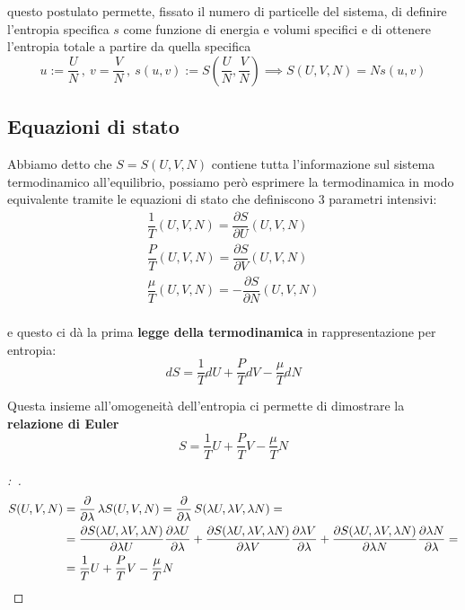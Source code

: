 \documentclass[11pt,a4paper,twoside]{book}
\newenvironment{dimo}[1][\proofname]{
	\begin{tcolorbox}[
	breakable, 
	enhanced, 
	interior hidden, 
	frame hidden, 
	borderline west = {1pt}{0pt}{gray}, 
	top=0pt, bottom=0pt, left=0pt]
\begin{proof}[#1:~]
}
{
\end{proof}
\end{tcolorbox}
}
\numberwithin{equation}{section} %
\begin{document}
questo postulato permette, fissato il numero di particelle del sistema, di definire l'entropia specifica $s$ come funzione di energia e volumi specifici e di ottenere l'entropia totale a partire da quella specifica
\[
u:=\dfrac{U}{N} \,,\>  v=\dfrac{V}{N} \,,\> s(u,v):=S\left(\dfrac{U}{N},\dfrac{V}{N}\right)  \implies S(U,V,N)=N s(u,v)
\]

\subsection{Equazioni di stato}

Abbiamo detto che $S=S(U,V,N)$ contiene tutta l'informazione sul sistema termodinamico all'equilibrio, possiamo però esprimere la termodinamica in modo equivalente tramite le equazioni di stato che definiscono $3$ parametri intensivi:
\begin{align}
\dfrac{1}{T}(U,V,N)=\dfrac{\partial S}{\partial U} (U,V,N) \\
\dfrac{P}{T}(U,V,N)=\dfrac{\partial S}{\partial V} (U,V,N) \\
\dfrac{\mu}{T}(U,V,N)=-\dfrac{\partial S}{\partial N} (U,V,N) \\
\end{align}

e questo ci dà la prima \textbf{legge della termodinamica} in rappresentazione per entropia:
\begin{equation}
dS=\dfrac{1}{T}dU+\dfrac{P}{T}dV-\dfrac{\mu}{T}dN
\end{equation}

Questa insieme all'omogeneità dell'entropia ci permette di dimostrare la \textbf{relazione di Euler}
\begin{equation}
S=\dfrac{1}{T}U+\dfrac{P}{T}V-\dfrac{\mu}{T}N
\end{equation}
\begin{dimo}\begin{align*}
S(U,V,N)&=\dfrac{\partial}{\partial \lambda} \,\lambda S(U,V,N) = 
   \dfrac{\partial}{\partial \lambda} \, S(\lambda U,\lambda V,\lambda N) =\\
&= \dfrac{\partial S(\lambda U,\lambda V,\lambda N)}{\partial \lambda U} \dfrac{\partial \lambda U}{\partial \lambda} +
\dfrac{\partial S(\lambda U,\lambda V,\lambda N)}{\partial \lambda V} \dfrac{\partial \lambda V}{\partial \lambda} +
\dfrac{\partial S(\lambda U,\lambda V,\lambda N)}{\partial \lambda N} \dfrac{\partial \lambda N}{\partial \lambda} =\\
&= \dfrac{1}{T}U+\dfrac{P}{T}V-\dfrac{\mu}{T}N  \qedhere
\end{align*}\end{dimo}
\end{document}
